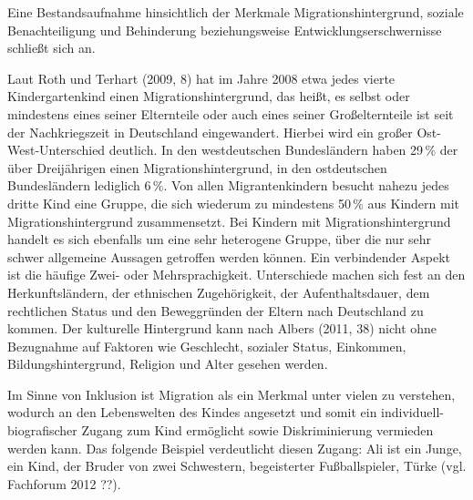 Eine Bestandsaufnahme hinsichtlich der Merkmale Migrationshintergrund, soziale Benachteiligung und Behinderung beziehungsweise Entwicklungserschwernisse schließt sich an.

Laut Roth und Terhart (2009, 8) hat im Jahre 2008 etwa jedes vierte Kindergartenkind einen Migrationshintergrund, das heißt, es selbst oder mindestens eines seiner Elternteile oder auch eines seiner Großelternteile ist seit der Nachkriegszeit in Deutschland eingewandert. Hierbei wird ein großer Ost-West-Unterschied deutlich. In den westdeutschen Bundesländern haben 29\,\% der über Dreijährigen einen Migrationshintergrund, in den ostdeutschen Bundesländern lediglich 6\,\%. Von allen Migrantenkindern besucht nahezu jedes dritte Kind eine Gruppe, die sich wiederum zu mindestens 50\,\% aus Kindern mit Migrationshintergrund zusammensetzt. Bei Kindern mit Migrationshintergrund handelt es sich ebenfalls um eine sehr heterogene Gruppe, über die nur sehr schwer allgemeine Aussagen getroffen werden können. Ein verbindender Aspekt ist die häufige Zwei- oder Mehrsprachigkeit. Unterschiede machen sich fest an den Herkunftsländern, der ethnischen Zugehörigkeit, der Aufenthaltsdauer, dem rechtlichen Status und den Beweggründen der Eltern nach Deutschland zu kommen. Der kulturelle Hintergrund kann nach Albers (2011, 38) nicht ohne Bezugnahme auf Faktoren wie Geschlecht, sozialer Status, Einkommen, Bildungshintergrund, Religion und Alter gesehen werden. 

Im Sinne von Inklusion ist Migration als ein Merkmal unter vielen zu verstehen, wodurch an den Lebenswelten des Kindes angesetzt und somit ein individuell-biografischer Zugang zum Kind ermöglicht sowie Diskriminierung vermieden werden kann. Das folgende Beispiel verdeutlicht diesen Zugang: Ali ist ein Junge, ein Kind, der Bruder von zwei Schwestern, begeisterter Fußballspieler, Türke (vgl. Fachforum 2012 ??).    
 
